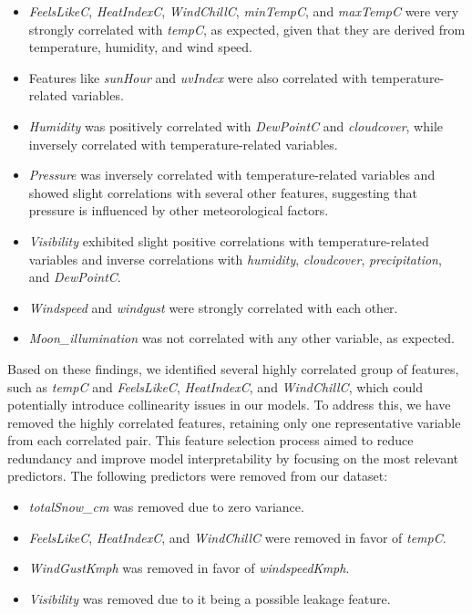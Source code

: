 \documentclass[twoside,11pt]{article}
\begin{document}
\begin{itemize}
    \item \textit{FeelsLikeC}, \textit{HeatIndexC}, \textit{WindChillC}, \textit{minTempC}, and \textit{maxTempC} were very strongly correlated with \textit{tempC}, as expected, given that they are derived from temperature, humidity, and wind speed.
    \item Features like \textit{sunHour} and \textit{uvIndex} were also correlated with temperature-related variables.
    \item \textit{Humidity} was positively correlated with \textit{DewPointC} and \textit{cloudcover}, while inversely correlated with temperature-related variables.
    \item \textit{Pressure} was inversely correlated with temperature-related variables and showed slight correlations with several other features, suggesting that pressure is influenced by other meteorological factors.
    \item \textit{Visibility} exhibited slight positive correlations with temperature-related variables and inverse correlations with \textit{humidity}, \textit{cloudcover}, \textit{precipitation}, and \textit{DewPointC}.
    \item \textit{Windspeed} and \textit{windgust} were strongly correlated with each other.
    \item \textit{Moon\_illumination} was not correlated with any other variable, as expected.
\end{itemize}

Based on these findings, we identified several highly correlated group of features, such as \textit{tempC} and \textit{FeelsLikeC}, \textit{HeatIndexC}, and \textit{WindChillC}, which could potentially introduce collinearity issues in our models. To address this, we have removed the highly correlated features, retaining only one representative variable from each correlated pair. This feature selection process aimed to reduce redundancy and improve model interpretability by focusing on the most relevant predictors. The following predictors were removed from our dataset:

\begin{itemize}
    \item \textit{totalSnow\_cm} was removed due to zero variance.
    \item \textit{FeelsLikeC}, \textit{HeatIndexC}, and \textit{WindChillC} were removed in favor of \textit{tempC}.
    \item \textit{WindGustKmph} was removed in favor of \textit{windspeedKmph}.
    \item \textit{Visibility} was removed due to it being a possible leakage feature.
\end{itemize}
\end{document}
